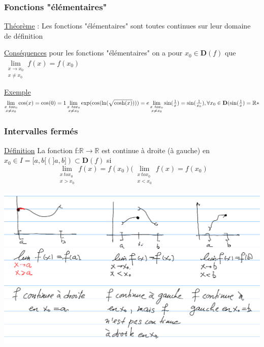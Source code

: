 \documentclass[12pt,a4paper]{article}
\newcommand{\limite}{\lim\limits_}
\newcommand{\R}{\ensuremath{\mathbb{R}} }
\newcommand{\rtor}{\ensuremath{\R \to \R} }
\newcommand{\Exemple}{\underline{Exemple} }
\newcommand{\Theoreme}{\underline{Théorème} }
\newcommand{\Definition}{\underline{Définition} }
\begin{document}
{\subsubsection{Fonctions "élémentaires"}

\begin{boite}
\Theoreme : Les fonctions "élémentaires" sont toutes continues sur leur domaine de définition
\end{boite}

\begin{boite}
\underline{Conséquences} pour les fonctions "élémentaires" on a pour $x_0 \in \mathbf{D}(f)$ que $\limite{\substack{x \to x_0 \\ x \neq x_0}} f(x) = f(x_0)$
\end{boite}
\Exemple $\limite{\substack{x \ to x_0 \\ x \neq x_0}} \cos(x) = \cos(0) = 1\\
\limite{\substack{x \ to x_0 \\ x \neq x_0}} \exp(\cos(\ln(\sqrt{\cosh(x)}))) = e\\
\limite{\substack{x \ to x_0 \\ x \neq x_0}} \sin(\frac{1}{x}) = \sin(\frac{1}{x_0}),\forall x_0 \in \mathbf{D}(\sin(\frac{1}{x}) = \R*$
\subsubsection{Intervalles fermés}
\begin{boite}
\Definition La fonction f:\rtor est continue à droite (à gauche) en $x_0 \in I = [a,b[ (]a,b]) \subset \mathbf{D}(f)$ si 
\begin{equation}
\limite{\substack{x \ to x_0 \\ x > x_0}} f(x) = f(x_0) (\limite{\substack{x \ to x_0 \\ x < x_0}} f(x) = f(x_0)
\end{equation}
\end{boite}
\includegraphics[scale=0.5]{illustrations_Analyse/interv_ferme}

}
\end{document}
